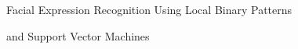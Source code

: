 %
%
%
%
\begin{titlepage}

	\vspace*{\fill}
	{\selectfont
	
	\noindent \colorbox{aaublue}{
		\parbox{\textwidth}{%
			\color{white}%
			\begin{center}
				\Huge{Facial Expression Recognition Using Local Binary Patterns } %
			\end{center}
			\begin{center}
				\Large{and Support Vector Machines} %
			\end{center}
		}}

	\vfill

}
\end{titlepage}
